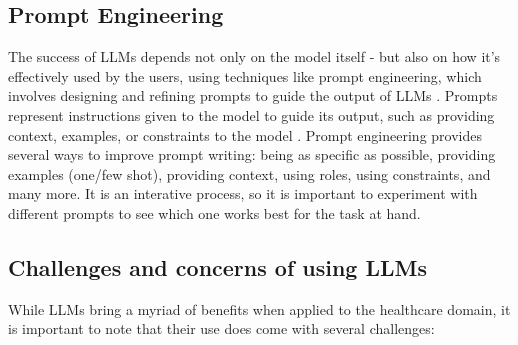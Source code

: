 \subsection{Prompt Engineering}

The success of LLMs depends not only on the model itself - but also on how it's effectively used by the users, using techniques like prompt engineering, which involves designing and refining prompts to guide the output of LLMs \parencite{promptmed}. Prompts represent instructions given to the model to guide its output, such as providing context, examples, or constraints to the model \parencite{prompt}. Prompt engineering provides several ways to improve prompt writing: being as specific as possible, providing examples (one/few shot), providing context, using roles, using constraints, and many more. It is an interative process, so it is important to experiment with different prompts to see which one works best for the task at hand.

\subsection{Challenges and concerns of using LLMs}

While LLMs bring a myriad of benefits when applied to the healthcare domain, it is important to note that their use does come with several challenges:

